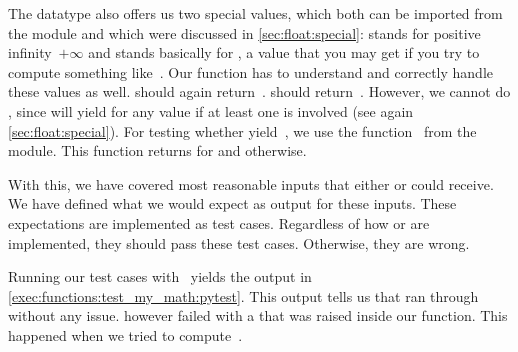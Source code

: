 The datatype  also offers us two special values, which both can be imported from the  module and which were discussed in \cref{sec:float:special}:
 stands for positive infinity~$+\infty$ and  stands basically for , a value that you may get if you try to compute something like~.
Our  function has to understand and correctly handle these values as well.
 should again return~.
 should return~.
However, we cannot do , since \pythonilIdx{==} will yield  for any value if at least one  is involved (see again \cref{sec:float:special}).
For testing whether  yield~, we use the function~ from the  module.
This function returns  for  and  otherwise.

With this, we have covered most reasonable inputs that either  or  could receive.
We have defined what we would expect as output for these inputs.
These expectations are implemented as test cases.
Regardless of how  or  are implemented, they should pass these test cases.
Otherwise, they are wrong.

Running our test cases with \pytest\ yields the output in \cref{exec:functions:test_my_math:pytest}.
This output tells us that  ran through without any issue.
 however failed with a  that was raised inside our  function.
This happened when we tried to compute~.

